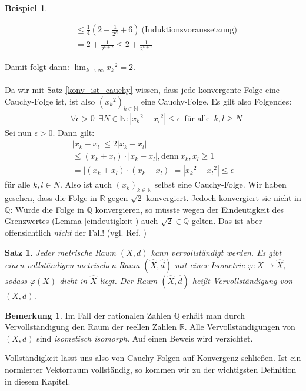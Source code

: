 \documentclass[10pt,a4paper]{article}
\theoremstyle{plain}
\newtheorem{satz}{Satz}[section]
\newenvironment{sa}{\begin{shaded}\begin{satz}}{\end{satz}\end{shaded}}
\theoremstyle{definition}
\theoremstyle{nonumberplain}
\newtheorem{beispiel}{Beispiel}
\newenvironment{bsp}{\begin{beispiel}}{\end{beispiel}}
\newtheorem{bemerkung}{Bemerkung}
\newenvironment{bem}{\begin{bemerkung}}{\end{bemerkung}}
\newcommand{\N}{\mathbb{N}}
\newcommand{\Q}{\mathbb{Q}}
\newcommand{\R}{\mathbb{R}}
\begin{document}
\begin{bsp}
\begin{itemize}
\begin{itemize}
\begin{align*}
& \leq \frac{1}{4} \left(2 + \frac{1}{2^k} + 6 \right) \:  \text{(Induktionsvoraussetzung)}\\
& = 2 + \frac{1}{2^{k+2}} \leq 2 + \frac{1}{2^{k+1}}
\end{align*}
\end{itemize}
\end{itemize}
Damit folgt dann: $\lim_{k\to\infty}{{x_k}^2} = 2$.\\\\
Da wir mit Satz \hyperref[konv_ist_cauchy]{\ref*{konv_ist_cauchy}} wissen, dass jede konvergente Folge eine Cauchy-Folge ist, ist also ${({x_k}^2)}_{k \in \N}$ eine Cauchy-Folge. Es gilt also Folgendes: 
\begin{align*}
& \forall \epsilon > 0 \enspace \exists N \in \N : |{x_k}^2 - {x_l}^2| \leq \epsilon \enspace \text{für alle} \enspace k,l \geq N
\end{align*}
Sei nun $\epsilon > 0$. Dann gilt:
\begin{gather*}
|{x_k} - {x_l}| \leq 2 |{x_k} - {x_l}|\\
\leq (x_k + x_l)\cdot|{x_k} - {x_l}|, \text{denn} \: x_k, x_l \geq 1\\
= |(x_k + x_l) \cdot (x_k - x_l)| = |{x_k}^2 - {x_l}^2| \leq \epsilon
\end{gather*}
für alle $k, l \in N$. Also ist auch ${(x_k)_{k \in \N}}$ selbst eine Cauchy-Folge. Wir haben gesehen, dass die Folge in $\R$ gegen $\sqrt{2}$ konvergiert. Jedoch konvergiert sie nicht in $\Q$:  Würde die Folge in $\Q$ konvergieren, so müsste wegen der Eindeutigkeit des Grenzwertes (Lemma  \hyperref[eindeutigkeit]{\ref*{eindeutigkeit}}) auch $\sqrt{2} \in \Q$ gelten. Das ist aber offensichtlich \textit{nicht} der Fall! (vgl. Ref. \cite{biel})
\end{bsp}
\begin{sa}
Jeder metrische Raum $(X,d)$ kann vervollständigt werden. Es gibt einen vollständigen metrischen Raum $(\hat{X},\hat{d})$ mit einer Isometrie $\varphi: X \rightarrow \hat{X}$, sodass $\varphi(X)$ dicht in $\hat{X}$ liegt. Der Raum $(\hat{X},\hat{d})$ heißt \textit{Vervollständigung} von $(X,d)$.
\end{sa}
\begin{bem}
Im Fall der rationalen Zahlen $\Q$ erhält man durch Vervollständigung den Raum der reellen Zahlen $\R$.
Alle Vervollständigungen von $(X,d)$ sind \textit{isometisch isomorph}. Auf einen Beweis wird verzichtet.
\end{bem}
Vollständigkeit lässt uns also von Cauchy-Folgen auf Konvergenz schließen. Ist ein normierter Vektorraum vollständig, so kommen wir zu der wichtigsten Definition in diesem Kapitel.
\end{document}
